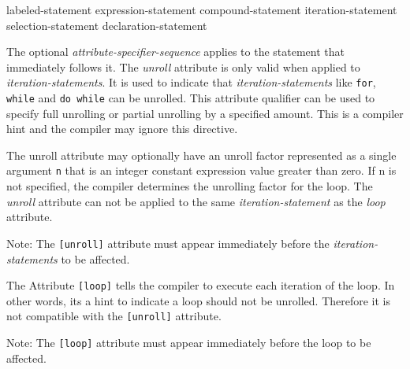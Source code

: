 \begin{grammar}
    \br
    labeled-statement\br
     expression-statement\br
     compound-statement\br
     iteration-statement\br
     selection-statement\br
    declaration-statement
\end{grammar}
\p The optional \textit{attribute-specifier-sequence} applies to the statement that immediately follows it.
\p The \textit{unroll}  attribute is only valid when applied to 
\textit{iteration-statements}. It is used to indicate that 
\textit{iteration-statements} like \texttt{for}, \texttt{while} and 
\texttt{do while} can be unrolled. This attribute qualifier can be used to 
specify full unrolling or partial unrolling by a specified amount. This is a 
compiler hint  and the compiler may ignore this directive.

\p The unroll attribute may optionally have an unroll factor represented as a 
single argument \texttt{n}  that is an integer constant expression value 
greater than zero. If n is not  specified, the compiler determines the 
unrolling factor for the loop. The \textit{unroll} attribute can not be applied
 to the same \textit{iteration-statement} as the \textit{loop} attribute.

 \p Note: The \texttt{[unroll]} attribute  must appear immediately before the \textit{iteration-statements}
 to be affected.

\p The Attribute \texttt{[loop]} tells the compiler to execute each iteration of 
the loop. In other words, its a hint to indicate a loop should not be 
unrolled. Therefore it is not compatible with the \texttt{[unroll]} attribute.

\p Note: The \texttt{[loop]} attribute  must appear immediately before the loop
 to be affected.
 